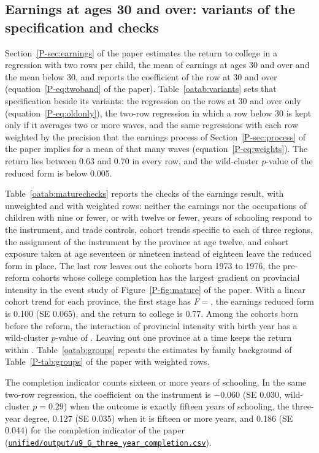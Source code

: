 \documentclass[11pt]{article}
\numberwithin{equation}{section}
\newcommand{\repourl}{https://github.com/JiachenJin1001/family-background-earnings-china}
\newcommand{\code}[1]{\href{\repourl/blob/main/#1}{\nolinkurl{#1}}}
\begin{document}
\subsection{Earnings at ages 30 and over: variants of the specification and checks}

Section~\ref{P-sec:earnings} of the paper estimates the return to
college in a regression with two rows per child, the mean of earnings
at ages 30 and over and the mean below 30, and reports the coefficient
of the row at 30 and over (equation~\eqref{P-eq:twoband} of the paper).
Table~\ref{oatab:variants} sets that specification beside its variants:
the regression on the rows at 30 and over only
(equation~\eqref{P-eq:oldonly}), the two-row regression in which a row
below 30 is kept only if it averages two or more waves, and the same
regressions with each row weighted by the precision that the earnings
process of Section~\ref{P-sec:process} of the paper implies for a mean
of that many waves (equation~\eqref{P-eq:weights}). The return lies
between 0.63 and 0.70 in every row, and the wild-cluster $p$-value of
the reduced form is below 0.005.

Table~\ref{oatab:maturechecks} reports the checks of the earnings
result, with unweighted and with weighted rows: neither the earnings nor the occupations of children with nine or fewer, or with twelve or fewer, years of schooling respond to the instrument, and trade controls, cohort trends specific to each of three regions,
the assignment of the instrument by the province at age twelve,
and cohort exposure taken at age seventeen or nineteen instead of eighteen
leave the reduced form in place. The last row leaves out the cohorts born 1973 to 1976, the pre-reform cohorts whose college completion has the largest gradient on provincial intensity in the event study of Figure~\ref{P-fig:mature} of the paper. With a linear cohort trend for each province, the first stage has $F = $, the earnings reduced form is 0.100 (SE 0.065), and the return to college is 0.77. Among the cohorts born before the reform, the
interaction of provincial intensity with birth year has a wild-cluster
$p$-value of . Leaving out one
province at a time keeps the return within
. Table~\ref{oatab:groups} repeats the
estimates by family background of Table~\ref{P-tab:groups} of the paper
with weighted rows.

The completion indicator counts sixteen or more years of schooling. In the same two-row regression, the coefficient on the instrument is $-0.060$ (SE 0.030, wild-cluster $p = 0.29$) when the outcome is exactly fifteen years of schooling, the three-year degree, 0.127 (SE 0.035) when it is fifteen or more years, and 0.186 (SE 0.044) for the completion indicator of the paper (\code{unified/output/u9_G_three_year_completion.csv}).
\end{document}
